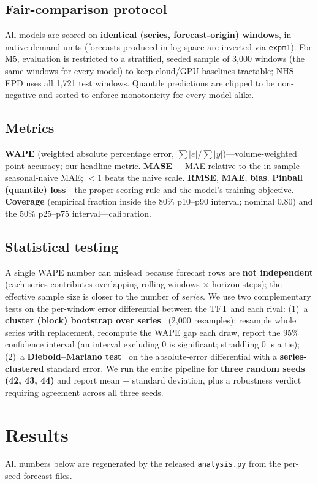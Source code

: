 \documentclass[11pt]{article}
\begin{document}
\subsection{Fair-comparison protocol}
All models are scored on \textbf{identical (series, forecast-origin) windows}, in native
demand units (forecasts produced in log space are inverted via \texttt{expm1}). For M5,
evaluation is restricted to a stratified, seeded sample of 3{,}000 windows (the same windows
for every model) to keep cloud/GPU baselines tractable; NHS-EPD uses all 1{,}721 test windows.
Quantile predictions are clipped to be non-negative and sorted to enforce monotonicity for
every model alike.

\subsection{Metrics}
\textbf{WAPE} (weighted absolute percentage error, $\sum|e|/\sum|y|$)---volume-weighted point
accuracy; our headline metric. \textbf{MASE}~\cite{mase}---MAE relative to the in-sample
seasonal-naive MAE; $<1$ beats the naive scale. \textbf{RMSE}, \textbf{MAE}, \textbf{bias}.
\textbf{Pinball (quantile) loss}---the proper scoring rule and the model's training objective.
\textbf{Coverage} (empirical fraction inside the 80\% p10--p90 interval; nominal 0.80) and the
50\% p25--p75 interval---calibration.

\subsection{Statistical testing}
A single WAPE number can mislead because forecast rows are \textbf{not independent} (each
series contributes overlapping rolling windows $\times$ horizon steps); the effective sample
size is closer to the number of \emph{series}. We use two complementary tests on the
per-window error differential between the TFT and each rival:
(1)~a \textbf{cluster (block) bootstrap over series}~\cite{kunsch} (2{,}000 resamples):
resample whole series with replacement, recompute the WAPE gap each draw, report the 95\%
confidence interval (an interval excluding 0 is significant; straddling 0 is a tie);
(2)~a \textbf{Diebold--Mariano test}~\cite{dm} on the absolute-error differential with a
\textbf{series-clustered} standard error. We run the entire pipeline for \textbf{three random
seeds (42, 43, 44)} and report mean $\pm$ standard deviation, plus a robustness verdict
requiring agreement across all three seeds.

\section{Results}
All numbers below are regenerated by the released \texttt{analysis.py} from the per-seed
forecast files.
\end{document}
